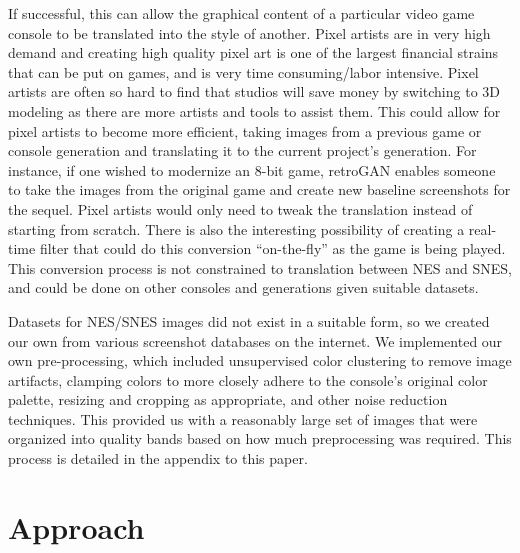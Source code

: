 \documentclass[10pt,twocolumn,letterpaper]{article}
\begin{document}
If successful, this can allow the graphical content of a particular video game console to be translated into the style of another. Pixel artists are in very high demand and creating high quality pixel art is one of the largest financial strains that can be put on games, and is very time consuming/labor intensive. Pixel artists are often so hard to find that studios will save money by switching to 3D modeling as there are more artists and tools to assist them. This could allow for pixel artists to become more efficient, taking images from a previous game or console generation and translating it to the current project's generation. For instance, if one wished to modernize an 8-bit game, retroGAN enables someone to take the images from the original game and create new baseline screenshots for the sequel. Pixel artists would only need to tweak the translation instead of starting from scratch. There is also the interesting possibility of creating a real-time filter that could do this conversion ``on-the-fly'' as the game is being played. This conversion process is not constrained to translation between NES and SNES, and could be done on other consoles and generations given suitable datasets.


Datasets for NES/SNES images did not exist in a suitable form, so we created our own from various screenshot databases on the internet. We implemented our own pre-processing, which included unsupervised color clustering to remove image artifacts, clamping colors to more closely adhere to the console's original color palette, resizing and cropping as appropriate, and other noise reduction techniques. This provided us with a reasonably large set of images that were organized into quality bands based on how much preprocessing was required. This process is detailed in the appendix to this paper.

\section{Approach}

\end{document}
